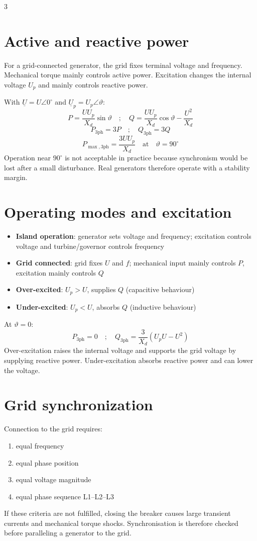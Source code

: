 \documentclass[9pt, landscape, a4paper]{article}
\begin{document}
\begin{multicols*}{3}
\section{Active and reactive power}
For a grid-connected generator, the grid fixes terminal voltage and frequency.
Mechanical torque mainly controls active power. Excitation changes the internal
voltage $U_p$ and mainly controls reactive power.

With $\underline U=U\angle0^\circ$ and $\underline U_p=U_p\angle\vartheta$:
\[
  P=\frac{UU_p}{X_d}\sin\vartheta
  \quad ; \quad
  Q=\frac{UU_p}{X_d}\cos\vartheta-\frac{U^2}{X_d}
\]
\[
  P_{3\mathrm{ph}}=3P
  \quad ; \quad
  Q_{3\mathrm{ph}}=3Q
\]
\[
  P_{\max,3\mathrm{ph}}=\frac{3UU_p}{X_d}
  \quad\text{at}\quad \vartheta=90^\circ
\]
Operation near $90^\circ$ is not acceptable in practice because synchronism
would be lost after a small disturbance. Real generators therefore operate with
a stability margin.

\section{Operating modes and excitation}
\begin{itemize}
  \item \textbf{Island operation}: generator sets voltage and frequency;
        excitation controls voltage and turbine/governor controls frequency
  \item \textbf{Grid connected}: grid fixes $U$ and $f$; mechanical input mainly
        controls $P$, excitation mainly controls $Q$
  \item \textbf{Over-excited}: $U_p>U$, supplies $Q$ (capacitive behaviour)
  \item \textbf{Under-excited}: $U_p<U$, absorbs $Q$ (inductive behaviour)
\end{itemize}
At $\vartheta=0$:
\[
  P_{3\mathrm{ph}}=0
  \quad ; \quad
  Q_{3\mathrm{ph}}=\frac{3}{X_d}\left(U_pU-U^2\right)
\]
Over-excitation raises the internal voltage and supports the grid voltage by
supplying reactive power. Under-excitation absorbs reactive power and can lower
the voltage.

\section{Grid synchronization}
Connection to the grid requires:
\vspace*{-.2cm}
\begin{enumerate}[label=\arabic*.]
  \item equal frequency
  \item equal phase position
  \item equal voltage magnitude
  \item equal phase sequence L1--L2--L3
\end{enumerate}
If these criteria are not fulfilled, closing the breaker causes large transient
currents and mechanical torque shocks. Synchronisation is therefore checked
before paralleling a generator to the grid.


\end{multicols*}
\end{document}
